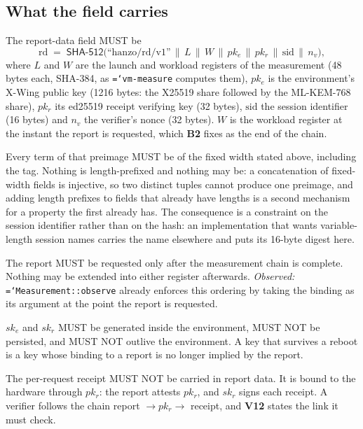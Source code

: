 \documentclass[11pt,a4paper]{article}
\newcommand{\code}[1]{\texttt{\hyphenchar\font=`\-\relax #1}}
\newcommand{\req}[1]{\textbf{#1}}
\begin{document}
\subsection{What the field carries}

\begin{description}[leftmargin=1.6em]
\item[\req{B1}] The report-data field MUST be
\[
\mathrm{rd} \;=\; \mathsf{SHA\text{-}512}\big(\text{``hanzo/rd/v1''} \,\|\, L \,\|\, W \,\|\, pk_e \,\|\, pk_r \,\|\, \mathrm{sid} \,\|\, n_v\big),
\]
where $L$ and $W$ are the launch and workload registers of the measurement
(48 bytes each, SHA-384, as \code{vm-measure} computes them), $pk_e$ is the
environment's X-Wing public key (1216 bytes: the X25519 share followed by the
ML-KEM-768 share), $pk_r$ its ed25519 receipt verifying key (32 bytes),
$\mathrm{sid}$ the session identifier (16 bytes) and $n_v$ the verifier's nonce
(32 bytes). $W$ is the workload register at the instant the report is requested,
which \req{B2} fixes as the end of the chain.

\item[\req{B1a}] Every term of that preimage MUST be of the fixed width stated
above, including the tag. Nothing is length-prefixed and nothing may be: a
concatenation of fixed-width fields is injective, so two distinct tuples cannot
produce one preimage, and adding length prefixes to fields that already have
lengths is a second mechanism for a property the first already has. The
consequence is a constraint on the session identifier rather than on the hash: an
implementation that wants variable-length session names carries the name
elsewhere and puts its 16-byte digest here.

\item[\req{B2}] The report MUST be requested only after the measurement chain is
complete. Nothing may be extended into either register afterwards. \emph{Observed:}
\code{Measurement::observe} already enforces this ordering by taking the binding as
its argument at the point the report is requested.

\item[\req{B3}] $sk_e$ and $sk_r$ MUST be generated inside the environment, MUST
NOT be persisted, and MUST NOT outlive the environment. A key that survives a
reboot is a key whose binding to a report is no longer implied by the report.

\item[\req{B4}] The per-request receipt MUST NOT be carried in report data. It is
bound to the hardware through $pk_r$: the report attests $pk_r$, and $sk_r$ signs
each receipt. A verifier follows the chain report $\rightarrow pk_r \rightarrow$
receipt, and \req{V12} states the link it must check.


\end{description}
\end{document}
